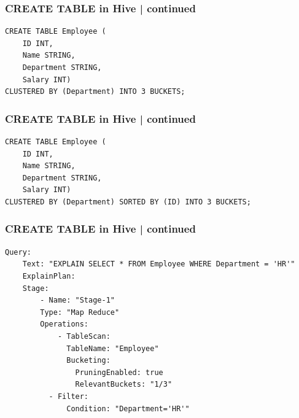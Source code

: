 \begin{frame}[fragile]
\frametitle{CREATE TABLE in Hive | continued}	
\begin{tcolorbox}[colback=white,colframe=black,title= Part 6: Clustering and Sorting | SORTED BY]
	\small
\begin{lstlisting}[caption={With CLUSTERED BY and SORT BY},style=my-yamll]
CREATE TABLE Employee (
    ID INT,
    Name STRING,
    Department STRING,
    Salary INT)
CLUSTERED BY (Department) INTO 3 BUCKETS;
\end{lstlisting}
\end{tcolorbox}
\end{frame}

\begin{frame}[fragile]
\frametitle{CREATE TABLE in Hive | continued}	
\begin{tcolorbox}[colback=white,colframe=black,title= Part 6: Clustering and Sorting | SORTED BY]
	\small
\begin{lstlisting}[caption={With only CLUSTERED BY},style=my-yamll]
CREATE TABLE Employee (
    ID INT,
    Name STRING,
    Department STRING,
    Salary INT)
CLUSTERED BY (Department) SORTED BY (ID) INTO 3 BUCKETS;
\end{lstlisting}
\end{tcolorbox}
\end{frame}



\begin{frame}[fragile]
\frametitle{CREATE TABLE in Hive | continued}	
\vspace{-0.5cm}

\begin{tcolorbox}[colback=white,colframe=black,title= Part 6: Clustering and Sorting | SORTED BY]
	\small
\begin{lstlisting}[caption={Simplified Explain Plan With only CLUSTERED BY},style=my-yamll]
Query: 
    Text: "EXPLAIN SELECT * FROM Employee WHERE Department = 'HR'"
    ExplainPlan:
    Stage:
        - Name: "Stage-1"
        Type: "Map Reduce"
        Operations:
            - TableScan: 
              TableName: "Employee"
              Bucketing: 
                PruningEnabled: true
                RelevantBuckets: "1/3"
          - Filter: 
              Condition: "Department='HR'"
\end{lstlisting}
\end{tcolorbox}
\end{frame}

